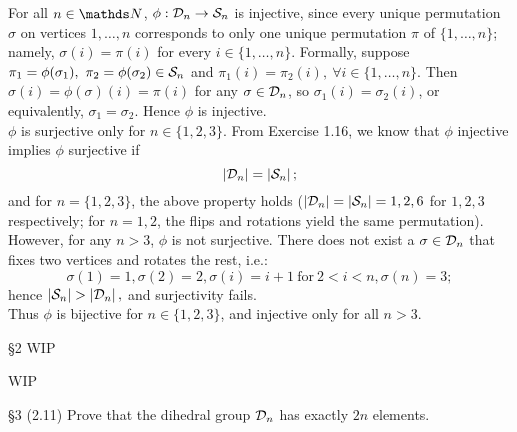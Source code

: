 \documentclass{homework}
\begin{document}
\begin{solution}
  For all $n\in \N$, $\phi:\mathcal{D}_n\to \mathcal{S}_n$ is  injective, since every unique permutation
  $\sigma$ on vertices $1,\ldots,n$ corresponds to only one unique permutation $\pi$ of $\{
  1,\ldots,n \}$; namely, $\sigma(i)=\pi(i)$ for every $i\in \{ 1,\ldots,n \}$. Formally, suppose
  $\pi_1=\phi(\sigma_1),\ \pi_2=\phi(\sigma_2)\in \cS_n$ and $\pi_1(i)=\pi_2(i),\ \forall i\in \{
  1,\ldots,n \}$. Then $\sigma(i)=\phi(\sigma)(i)=\pi(i)$ for any $\sigma\in \mathcal{D}_n$, so
  $\sigma_1(i)=\sigma_2(i)$, or equivalently, $\sigma_1=\sigma_2$. Hence $\phi$ is injective.\\
  $\phi$ is surjective only for $n\in \{ 1,2,3 \}$. From Exercise 1.16, we know that  $\phi$ 
  injective implies $\phi$ surjective if \[\left| \mathcal{D}_n \right| = \left| \mathcal{S}_n \right|;\] and for
  $n=\{ 1,2,3 \}$, the above property holds ($\left| \mathcal{D}_n \right| =\left| \mathcal{S}_n \right|=1,2,6$ for
  $1,2,3$ respectively; for $n=1,2$, the flips and rotations yield the same permutation). However,
  for any $n>3$, $\phi$ is not surjective. There does not exist a  $\sigma\in \mathcal{D}_n$ that fixes two
  vertices and rotates the rest, i.e.: \[
    \sigma(1)=1,\sigma(2)=2,\sigma(i)=i+1~\text{for}~2<i<n,\sigma(n)=3;
  \] hence $\left| \mathcal{S}_n \right| > \left| \mathcal{D}_n \right|,$ and surjectivity fails.\\
  Thus $\phi$ is bijective for $n\in \{ 1,2,3 \}$, and injective only for all $n>3$.
\end{solution}

\begin{problem}{\S 2}
  WIP
\end{problem}
\begin{solution}
  WIP
\end{solution}



\begin{problem}{\S 3}
  (2.11) Prove that the dihedral group $\mathcal{D}_n$ has exactly $2n$ elements.
\end{problem}
\end{document}
